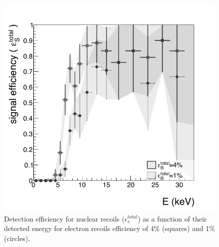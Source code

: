 \documentclass[physics,article,submit,moreauthors,pdftex]{Definitions/mdpi}
\begin{document}
 
%
%
 
\begin{figure}[t!]
  \centering
    \includegraphics[width=0.49\linewidth]{energyFull_effi_bw.png}
    \caption{Detection efficiency for nuclear recoils ($\epsilon^{total}_s$) as a function of their detected energy for electron recoils efficiency of 4\% (squares) and 1\% (circles).}
      \label{fig:coronello}
\end{figure}
\end{document}
